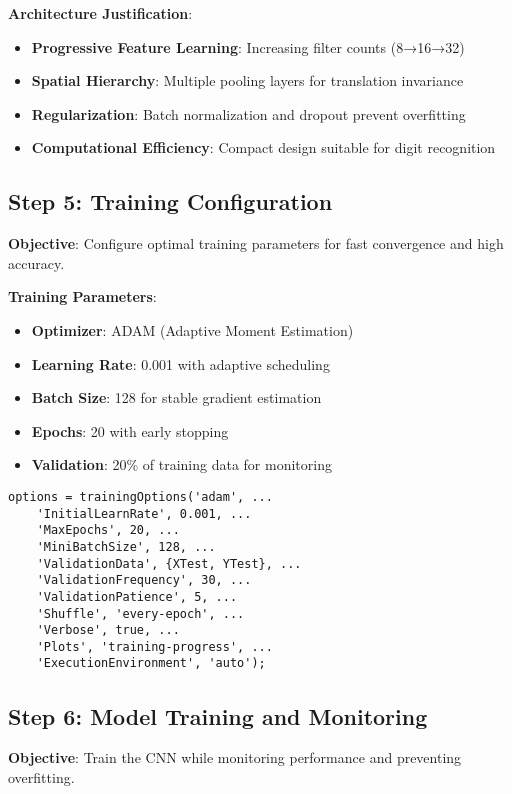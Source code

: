 \documentclass[12pt,a4paper]{article}
\begin{document}
\textbf{Architecture Justification}:
\begin{itemize}
    \item \textbf{Progressive Feature Learning}: Increasing filter counts (8→16→32)
    \item \textbf{Spatial Hierarchy}: Multiple pooling layers for translation invariance
    \item \textbf{Regularization}: Batch normalization and dropout prevent overfitting
    \item \textbf{Computational Efficiency}: Compact design suitable for digit recognition
\end{itemize}

\subsection{Step 5: Training Configuration}

\textbf{Objective}: Configure optimal training parameters for fast convergence and high accuracy.

\textbf{Training Parameters}:
\begin{itemize}
    \item \textbf{Optimizer}: ADAM (Adaptive Moment Estimation)
    \item \textbf{Learning Rate}: 0.001 with adaptive scheduling
    \item \textbf{Batch Size}: 128 for stable gradient estimation
    \item \textbf{Epochs}: 20 with early stopping
    \item \textbf{Validation}: 20\% of training data for monitoring
\end{itemize}

\begin{lstlisting}[caption=Training Options Configuration]
options = trainingOptions('adam', ...
    'InitialLearnRate', 0.001, ...
    'MaxEpochs', 20, ...
    'MiniBatchSize', 128, ...
    'ValidationData', {XTest, YTest}, ...
    'ValidationFrequency', 30, ...
    'ValidationPatience', 5, ...
    'Shuffle', 'every-epoch', ...
    'Verbose', true, ...
    'Plots', 'training-progress', ...
    'ExecutionEnvironment', 'auto');
\end{lstlisting}

\subsection{Step 6: Model Training and Monitoring}

\textbf{Objective}: Train the CNN while monitoring performance and preventing overfitting.
\end{document}
